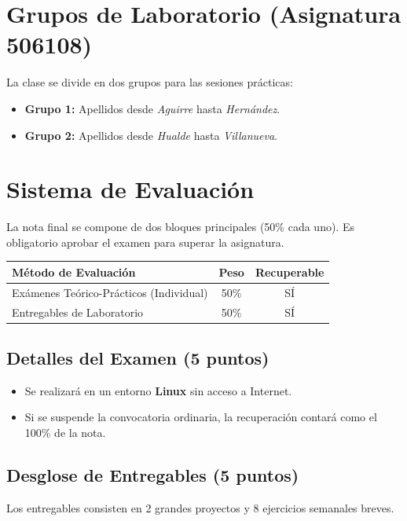 \documentclass[spanish,12pt,a4paper]{article}
\begin{document}
\section*{Grupos de Laboratorio (Asignatura 506108)}
La clase se divide en dos grupos para las sesiones pr\'{a}cticas:
\begin{itemize}
    \item \textbf{Grupo 1:} Apellidos desde \textit{Aguirre} hasta \textit{Hern\'{a}ndez}.
    \item \textbf{Grupo 2:} Apellidos desde \textit{Hualde} hasta \textit{Villanueva}.
\end{itemize}

\newpage

\section*{Sistema de Evaluaci\'{o}n}

La nota final se compone de dos bloques principales (50\% cada uno). Es obligatorio aprobar el examen para superar la asignatura.

\begin{table}[H]
\centering
\renewcommand{\arraystretch}{1.5}
\begin{tabular}{lcc}
\toprule
\textbf{M\'{e}todo de Evaluaci\'{o}n} & \textbf{Peso} & \textbf{Recuperable} \\
\midrule
Ex\'{a}menes Te\'{o}rico-Pr\'{a}cticos (Individual) & 50\% & S\'{I} \\
Entregables de Laboratorio & 50\% & S\'{I} \\
\bottomrule
\end{tabular}
\end{table}

\subsection*{Detalles del Examen (5 puntos)}
\begin{itemize}
    \item Se realizar\'{a} en un entorno \textbf{Linux} sin acceso a Internet.
    \item Si se suspende la convocatoria ordinaria, la recuperaci\'{o}n contar\'{a} como el 100\% de la nota.
\end{itemize}

\subsection*{Desglose de Entregables (5 puntos)}
Los entregables consisten en 2 grandes proyectos y 8 ejercicios semanales breves.
\end{document}
